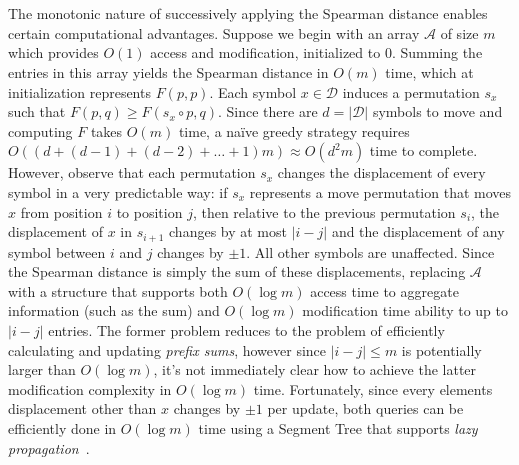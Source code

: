 \documentclass{siamart190516}
\begin{document}
\\
\\
\noindent 
The monotonic nature of successively applying the Spearman distance enables certain computational advantages. Suppose we begin with an array $\mathcal{A}$ of size $m$ which provides $O(1)$ access and modification, initialized to $0$. Summing the entries in this array yields the Spearman distance in $O(m)$ time, which at initialization represents $F(p, p)$. Each symbol $x \in \mathcal{D}$ induces a  permutation $s_x$ such that $F(p, q) \geq F(s_x \circ p, q)$. Since there are $d = \lvert \mathcal{D} \rvert$ symbols to move and computing $F$ takes $O(m)$ time, a na\"ive greedy strategy requires $O((d+(d-1)+(d-2)+\dots+1)m) \approx O(d^2 m)$ time to complete. However, observe that each permutation $s_x$ changes the displacement of every symbol in a very predictable way: if $s_x$ represents a move permutation that moves $x$ from position $i$ to position $j$, then relative to the previous permutation $s_{i}$, the displacement of $x$ in $s_{i+1}$ changes by at most  $\lvert i - j \rvert$ and the displacement of any symbol between $i$ and $j$ changes by $\pm 1$. All other symbols are unaffected. Since the Spearman distance is simply the sum of these displacements, replacing $\mathcal{A}$ with a structure that supports both $O(\log m)$ access time to aggregate information (such as the sum) and $O(\log m)$ modification time ability to up to $\lvert i - j \vert$ entries. 
The former problem reduces to the problem of efficiently calculating and updating \emph{prefix sums}, however since $\lvert i - j \rvert \leq m$ is potentially larger than $O(\log m)$, it's not immediately clear how to achieve the latter modification complexity in $O(\log m)$ time. Fortunately, since every elements displacement other than $x$ changes by $\pm 1$ per update, both queries can be efficiently done in $O(\log m)$ time using a Segment Tree that supports \emph{lazy propagation}~\cite{de1997computational}. 
\end{document}
